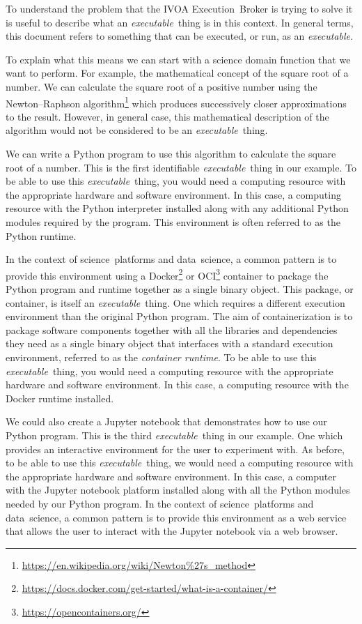 \documentclass[11pt,a4paper]{ivoa}
\newcommand{\webservice} {web service}
\newcommand{\webbrowser} {web browser}
\newcommand{\ivoa} {IVOA}
\newcommand{\executionbroker} {Execution~Broker}
\newcommand{\jupyternotebook} {Jupyter notebook}
\newcommand{\python} {Python}
\newcommand{\pythonprogram} {Python program}
\newcommand{\dockerruntime} {Docker runtime}
\newcommand{\footurl}[1] {\footnote{\url{#1}}}
\newcommand{\datascience} {data~science}
\newcommand{\scienceplatform} {science~platform}
\newcommand{\executable} {\textit{executable}}
\newcommand{\executablething} {\textit{executable}~thing}
\begin{document}
To understand the problem that the \ivoa{} \executionbroker{} is trying to solve
it is useful to describe what an \executablething{} is in this context.
In general terms, this document refers to something that can be executed, or run,
as an \executable{}.

To explain what this means we can start with a science domain function that we want to perform.
For example, the mathematical concept of the square root of a number.
We can calculate the square root of a positive number using the Newton–Raphson
algorithm\footurl{https://en.wikipedia.org/wiki/Newton\%27s_method}
which produces successively closer approximations to the result.
However, in general case, this mathematical description of the algorithm would not be
considered to be an \executablething{}.

We can write a \pythonprogram{} to use this algorithm to calculate the square root of a number.
This is the first identifiable \executablething{} in our example.
To be able to use this \executablething{}, you would need a computing resource with the appropriate
hardware and software environment. In this case, a computing resource with the \python{} interpreter
installed along with any additional \python{} modules required by the program.
This environment is often referred to as the \python{} runtime.

In the context of \scienceplatform{}s and \datascience{}, a common pattern is to provide this environment
using a Docker\footurl{https://docs.docker.com/get-started/what-is-a-container/}
or OCI\footurl{https://opencontainers.org/} container
to package the \pythonprogram{} and runtime together as a single binary object.
This package, or container, is itself an \executablething{}. One which requires a different execution
environment than the original \pythonprogram{}.
The aim of containerization is to package software components together with all the libraries and dependencies
they need as a single binary object that interfaces with a standard execution environment,
referred to as the \textit{container runtime}.
To be able to use this \executablething{}, you would need a computing resource with the appropriate
hardware and software environment. In this case, a computing resource with the \dockerruntime{} installed.

We could also create a \jupyternotebook{} that demonstrates how to use our \pythonprogram{}.
This is the third \executablething{} in our example.
One which provides an interactive environment for the user to experiment with.
As before, to be able to use this \executablething{}, we would need a computing resource with
the appropriate hardware and software environment.
In this case, a computer with the \jupyternotebook{} platform installed along with all the \python{} modules
needed by our \pythonprogram{}.
In the context of \scienceplatform{}s and \datascience{}, a common pattern is to provide this environment as a \webservice{}
that allows the user to interact with the \jupyternotebook{} via a \webbrowser.
\end{document}
